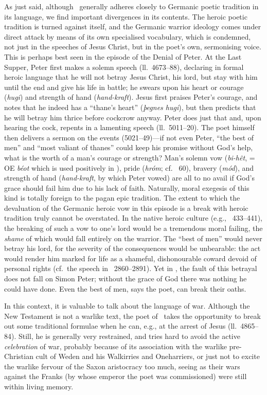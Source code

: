 As just said, although \Heliand\ generally adheres closely to Germanic poetic tradition in its language, we find important divergences in its contents.  The heroic poetic tradition is turned against itself, and the Germanic warrior ideology comes under direct attack by means of its own specialised vocabulary, which is condemned, not just in the speeches of Jesus Christ, but in the poet’s own, sermonising voice.  This is perhaps best seen in the episode of the Denial of Peter.  At the Last Supper, Peter first makes a solemn speech (ll.~4673--88), declaring in formal heroic language that he will not betray Jesus Christ, his lord, but stay with him until the end and give his life in battle; he swears upon his heart or courage (\emph{hugi}) and strength of hand (\emph{hand-kraft}).  Jesus first praises Peter’s courage, and notes that he indeed has a “thane’s heart” (\emph{þegnes hugi}), but then predicts that he will betray him thrice before cockcrow anyway.  Peter does just that and, upon hearing the cock, repents in a lamenting speech (ll.~5011--20).  The poet himself then delivers a sermon on the events (5021--49)---if not even Peter, “the best of men” and “most valiant of thanes” could keep his promise without God’s help, what is the worth of a man’s courage or strength?  Man’s solemn vow (\emph{bi-hêt}, = OE \emph{béot} which is used positively in \Beowulf), pride (\emph{hróm}; cf.~ 60), bravery (\emph{mód}), and strength of hand (\emph{hand-kraft}, by which Peter vowed) are all to no avail if God’s grace should fail him due to his lack of faith.  Naturally, moral exegesis of this kind is totally foreign to the pagan epic tradition.
The extent to which the devaluation of the Germanic heroic vow in this episode is a break with heroic tradition truly cannot be overstated.  In the native heroic culture (e.g., \Beowulf\ 433--441), the breaking of such a vow to one’s lord would be a tremendous moral failing, the \emph{shame} of which would fall entirely on the warrior.  The “best of men” would never betray his lord, for the severity of the consequences would be unbearable: the act would render him marked for life as a shameful, dishonourable coward devoid of personal rights (cf.~the speech in \Beowulf\ 2860--2891).  Yet in \Heliand, the fault of this betrayal does not fall on Simon Peter; without the grace of God there was nothing he could have done.  Even the best of men, says the poet, can break their oaths.

In this context, it is valuable to talk about the language of war.  Although the New Testament is not a warlike text, the poet of \Heliand\ takes the opportunity to break out some traditional formulae when he can, e.g., at the arrest of Jesus (ll.~4865--84).  Still, he is generally very restrained, and tries hard to avoid the active \emph{celebration} of war, probably because of its association with the warlike pre-Christian cult of Weden and his Walkirries and Oneharriers, or just not to excite the warlike fervour of the Saxon aristocracy too much, seeing as their wars against the Franks (by whose emperor the poet was commissioned) were still within living memory.

